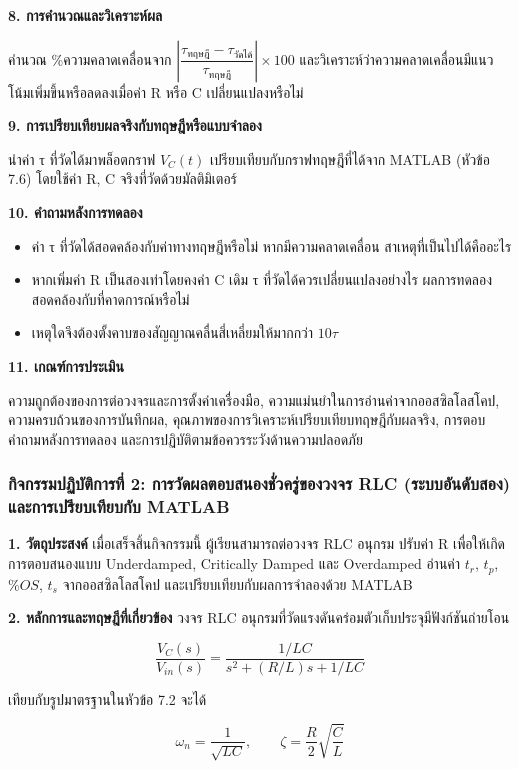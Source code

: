 \textbf{8. การคำนวณและวิเคราะห์ผล}

คำนวณ \%ความคลาดเคลื่อนจาก $\left|\dfrac{\tau_{\text{ทฤษฎี}}-\tau_{\text{วัดได้}}}{\tau_{\text{ทฤษฎี}}}\right|\times100$ และวิเคราะห์ว่าความคลาดเคลื่อนมีแนวโน้มเพิ่มขึ้นหรือลดลงเมื่อค่า R หรือ C เปลี่ยนแปลงหรือไม่

\textbf{9. การเปรียบเทียบผลจริงกับทฤษฎีหรือแบบจำลอง}

นำค่า τ ที่วัดได้มาพล็อตกราฟ $V_C(t)$ เปรียบเทียบกับกราฟทฤษฎีที่ได้จาก MATLAB (หัวข้อ 7.6) โดยใช้ค่า R, C จริงที่วัดด้วยมัลติมิเตอร์

\textbf{10. คำถามหลังการทดลอง}

\begin{itemize}
    \item ค่า τ ที่วัดได้สอดคล้องกับค่าทางทฤษฎีหรือไม่ หากมีความคลาดเคลื่อน สาเหตุที่เป็นไปได้คืออะไร
    \item หากเพิ่มค่า R เป็นสองเท่าโดยคงค่า C เดิม τ ที่วัดได้ควรเปลี่ยนแปลงอย่างไร ผลการทดลองสอดคล้องกับที่คาดการณ์หรือไม่
    \item เหตุใดจึงต้องตั้งคาบของสัญญาณคลื่นสี่เหลี่ยมให้มากกว่า $10\tau$
\end{itemize}

\textbf{11. เกณฑ์การประเมิน}

ความถูกต้องของการต่อวงจรและการตั้งค่าเครื่องมือ, ความแม่นยำในการอ่านค่าจากออสซิลโลสโคป, ความครบถ้วนของการบันทึกผล, คุณภาพของการวิเคราะห์เปรียบเทียบทฤษฎีกับผลจริง, การตอบคำถามหลังการทดลอง และการปฏิบัติตามข้อควรระวังด้านความปลอดภัย



\subsubsection{กิจกรรมปฏิบัติการที่ 2: การวัดผลตอบสนองชั่วครู่ของวงจร RLC (ระบบอันดับสอง) และการเปรียบเทียบกับ MATLAB}

\textbf{1. วัตถุประสงค์}
เมื่อเสร็จสิ้นกิจกรรมนี้ ผู้เรียนสามารถต่อวงจร RLC อนุกรม ปรับค่า R เพื่อให้เกิดการตอบสนองแบบ Underdamped, Critically Damped และ Overdamped อ่านค่า $t_r$, $t_p$, $\%OS$, $t_s$ จากออสซิลโลสโคป และเปรียบเทียบกับผลการจำลองด้วย MATLAB

\textbf{2. หลักการและทฤษฎีที่เกี่ยวข้อง}
วงจร RLC อนุกรมที่วัดแรงดันคร่อมตัวเก็บประจุมีฟังก์ชันถ่ายโอน

\[
\frac{V_C(s)}{V_{in}(s)} = \frac{1/LC}{s^2+(R/L)s+1/LC}
\]

เทียบกับรูปมาตรฐานในหัวข้อ 7.2 จะได้

\[
\omega_n = \frac{1}{\sqrt{LC}}, \qquad \zeta = \frac{R}{2}\sqrt{\frac{C}{L}}
\]

